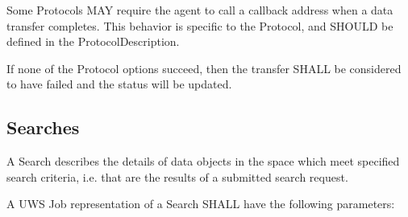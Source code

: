 \documentclass[11pt,a4paper]{ivoa}
\begin{document}
Some Protocols MAY require the agent to call a callback address when a data transfer completes. This behavior is specific to the Protocol, and SHOULD be defined in the ProtocolDescription.

If none of the Protocol options succeed, then the transfer SHALL be considered to have failed and the status will be updated.

\subsection{Searches}
A Search describes the details of data objects in the space which meet specified search criteria, i.e. that are the results of a submitted search request.

A UWS Job representation of a Search SHALL have the following parameters:
\end{document}
